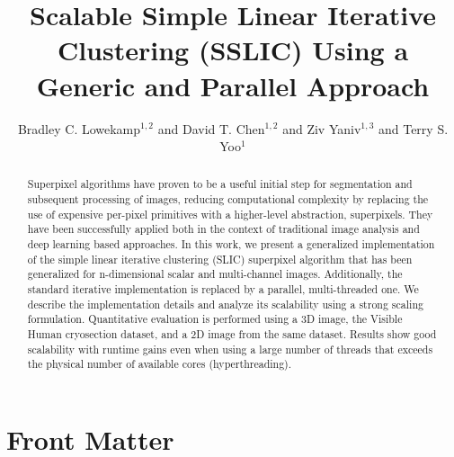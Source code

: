\documentclass{InsightArticle}
\title{Scalable Simple Linear Iterative Clustering (SSLIC) Using a
  Generic and Parallel Approach}
\author{Bradley C. Lowekamp$^{1,2}$ and David T. Chen$^{1,2}$ and Ziv Yaniv$^{1,3}$ and Terry S. Yoo$^{1}$}
\newcommand{\IJhandlerIDnumber}{3596}
\begin{document}
%
%
\IJhandlefooter{\IJhandlerIDnumber}


\ifpdf
\else
\fi


\maketitle


\ifhtml
\chapter*{Front Matter\label{front}}
\fi


\begin{abstract}
\noindent
Superpixel algorithms have proven to be a useful initial step for
segmentation and subsequent processing of images, reducing computational complexity 
by replacing the use of expensive per-pixel primitives with a higher-level abstraction, superpixels. 
They have been successfully applied both in the context of traditional image analysis and deep learning
based approaches. In this work, we present a generalized implementation of the simple linear iterative clustering
(SLIC) superpixel algorithm that has been generalized for n-dimensional
scalar and multi-channel images. Additionally, the standard iterative implementation
is replaced by a parallel, multi-threaded one. We describe the implementation
details and analyze its scalability using a strong scaling formulation. Quantitative evaluation 
is performed using a 3D image, the Visible Human cryosection dataset, and a 2D image
from the same dataset. Results show  good scalability with runtime gains even when using
a large number of threads that exceeds the physical number of available cores (hyperthreading).
\end{abstract}

\IJhandlenote{\IJhandlerIDnumber}
\end{document}
